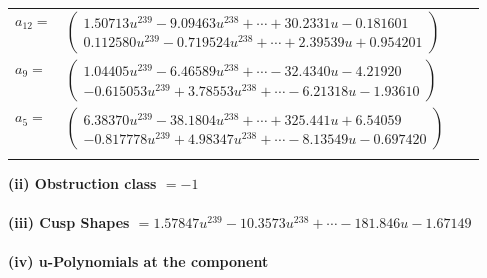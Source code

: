 \documentclass[1p]{elsarticle_modified}
\theoremstyle{definition}
\begin{document}
\begin{tabular}{m{7pt} m{180pt} m{7pt} m{180pt} }
\flushright $a_{12}=$&$\begin{pmatrix}1.50713 u^{239}-9.09463 u^{238}+\cdots+30.2331 u-0.181601\\0.112580 u^{239}-0.719524 u^{238}+\cdots+2.39539 u+0.954201\end{pmatrix}$ \\
\flushright $a_{9}=$&$\begin{pmatrix}1.04405 u^{239}-6.46589 u^{238}+\cdots-32.4340 u-4.21920\\-0.615053 u^{239}+3.78553 u^{238}+\cdots-6.21318 u-1.93610\end{pmatrix}$ \\
\flushright $a_{5}=$&$\begin{pmatrix}6.38370 u^{239}-38.1804 u^{238}+\cdots+325.441 u+6.54059\\-0.817778 u^{239}+4.98347 u^{238}+\cdots-8.13549 u-0.697420\end{pmatrix}$\\&\end{tabular}
\flushleft \textbf{(ii) Obstruction class $= -1$}\\~\\
\flushleft \textbf{(iii) Cusp Shapes $= 1.57847 u^{239}-10.3573 u^{238}+\cdots-181.846 u-1.67149$}\\~\\
\newpage\renewcommand{\arraystretch}{1}
\flushleft \textbf{(iv) u-Polynomials at the component}\newline \\
\end{document}
